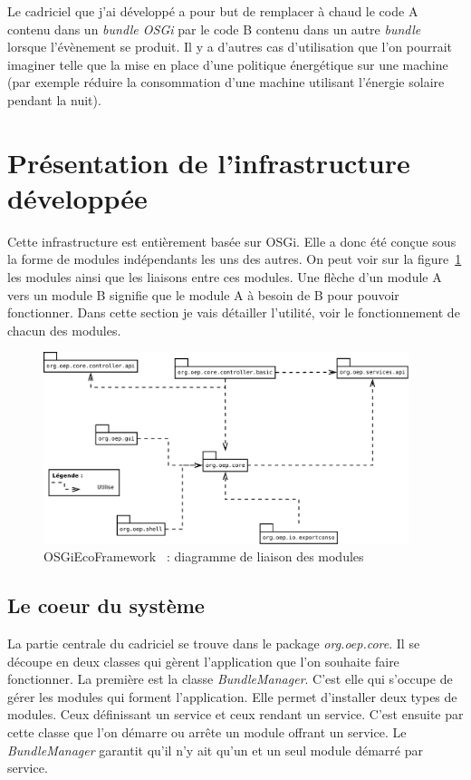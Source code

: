 \documentclass[a4paper, 11pt]{report}
\begin{document}
Le cadriciel que j'ai développé a pour but de remplacer à chaud le code A contenu dans un \textit{bundle OSGi} par le code B contenu dans un autre \textit{bundle} lorsque l'évènement se produit. Il y a d'autres cas d'utilisation que l'on pourrait imaginer telle que la mise en place d'une politique énergétique sur une machine (par exemple réduire la consommation d'une machine utilisant l'énergie solaire pendant la nuit).

	\section{Présentation de l'infrastructure développée}
Cette infrastructure est entièrement basée sur OSGi. Elle a donc été conçue sous la forme de modules indépendants les uns des autres. On peut voir sur la figure~\ref{BdlDiag} les modules ainsi que les liaisons entre ces modules. Une flèche d'un module A vers un module B signifie que le module A à besoin de B pour pouvoir fonctionner. Dans cette section je vais détailler l'utilité, voir le fonctionnement de chacun des modules.
	
\begin{figure}
	\centering
	\includegraphics[width=0.95\textwidth]{figures/EcoPattern_Bundle_Diagramme}
	\caption{OSGiEcoFramework ~: diagramme de liaison des modules}
	\label{BdlDiag}
\end{figure}
\subsection{Le coeur du système}
La partie centrale du cadriciel se trouve dans le package \textit{org.oep.core}. Il se découpe en deux classes qui gèrent l'application que l'on souhaite faire fonctionner. La première est la classe \textit{BundleManager}. C'est elle qui s'occupe de gérer les modules qui forment l'application. Elle permet d'installer deux types de modules. Ceux définissant un service et ceux rendant un service. C'est ensuite par cette classe que l'on démarre ou arrête un module offrant un service. Le \textit{BundleManager} garantit qu'il n'y ait qu'un et un seul module démarré par service.
\end{document}

